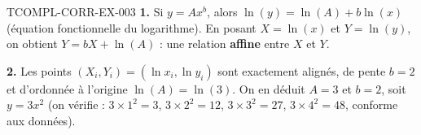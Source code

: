\begin{corrige}{TCOMPL-CORR-EX-003}
\textbf{1.} Si $y=Ax^b$, alors $\ln(y) = \ln(A) + b\ln(x)$ (équation fonctionnelle du logarithme). En posant $X=\ln(x)$ et $Y=\ln(y)$, on obtient $Y = bX + \ln(A)$ : une relation \textbf{affine} entre $X$ et $Y$.

\textbf{2.} Les points $(X_i,Y_i) = (\ln x_i, \ln y_i)$ sont exactement alignés, de pente $b=2$ et d'ordonnée à l'origine $\ln(A)=\ln(3)$. On en déduit $A=3$ et $b=2$, soit $y=3x^2$ (on vérifie : $3\times1^2=3$, $3\times2^2=12$, $3\times3^2=27$, $3\times4^2=48$, conforme aux données).
\end{corrige}
